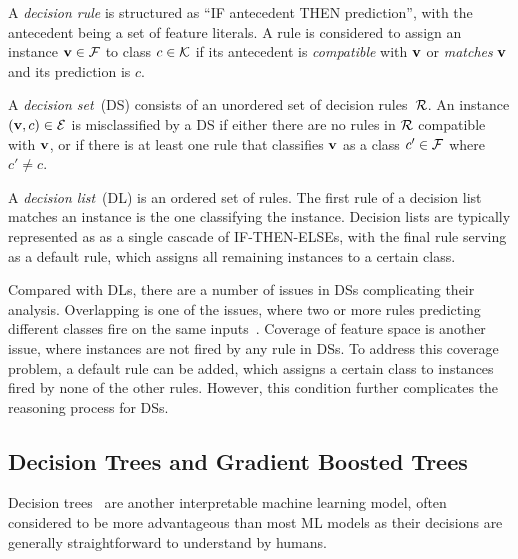 A \emph{decision rule} is structured as ``IF antecedent THEN
prediction'', with the antecedent being a set of feature literals.
%
A rule is considered to assign an instance $\mathbf{v}\in{\mathcal{F}}$
to class $c\in{\mathcal{K}}$ if its antecedent is \emph{compatible} with
$\mathbf{v}$ or \emph{matches} $\mathbf{v}$ and its prediction is $c$.

A \emph{decision set}~(DS) consists of an unordered set 
of decision rules~${\mathcal{R}}$.
%
An instance $(\mathbf{v},c)\in{\mathcal{E}}$ is misclassified by a DS if either
there are no rules in ${\mathcal{R}}$ compatible with $\mathbf{v}$, or if there 
is at least one rule that classifies $\mathbf{v}$ as a class $c'\in{\mathcal{F}}$
where $c'\neq c$.

A \emph{decision list}~(DL) is an ordered set of rules. 
%
The first rule of a decision list matches an instance is the one classifying the instance.
%
Decision lists are typically represented as as a single cascade of 
IF-THEN-ELSEs, with the final rule serving as a default rule, 
which assigns all remaining instances to a certain class.

Compared with DLs, there are a number of issues in DSs
complicating their analysis.
%
Overlapping is one of the issues, where two or more rules predicting
different classes fire on the same inputs~\cite{ms-rw22,msi-fai23}. 
%
Coverage of feature space is another issue, where instances are not
fired by any rule in DSs.
%
To address this coverage problem, a default rule can be added, which 
assigns a certain class to instances fired by none of the other rules.
%
However, this condition further complicates the
reasoning process for DSs.

\subsection{Decision Trees and Gradient Boosted Trees}
Decision trees~\cite{rivest-ipl76,breiman-bk84,quinlan-bk93,quinlan-ml86}
are another interpretable machine learning model, often considered to be
more advantageous than most ML models as their decisions are generally
straightforward to understand by humans.

